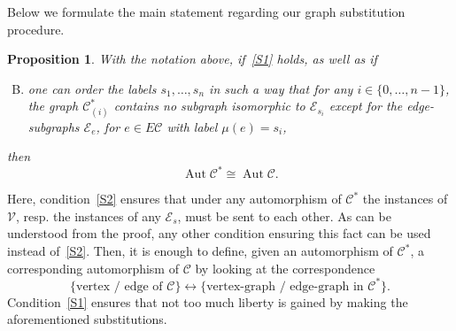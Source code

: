 \documentclass[10pt,a4paper]{amsart}
\newtheorem{prop}[theo]{Proposition}
\theoremstyle{definition}
\newcommand{\cC}{\mathcal{C}}
\newcommand{\cV}{\mathcal{V}}
\newcommand{\cE}{\mathcal{E}}
\DeclareMathOperator{\aut}{Aut}
\begin{document}
Below we formulate the main statement regarding our graph substitution procedure. 

\begin{prop} \label{prop:graph-substitution}
With the notation above, if~\ref{S1} holds, as well as if
\begin{enumerate}[S.\arabic*] %
\setcounter{enumi}{1}
\item \label{S2}
one can order the labels $s_{1}, \dots, s_n$ in such a way that for any $i\in\{0, \dots, n-1\}$, the graph $\cC^*_{(i)}$ contains no subgraph isomorphic to $\cE_{s_{i}}$ except for the edge-subgraphs $\cE_{e}$, for $e\in E\cC$ with label ${\mu}(e)=s_{i}$,
\end{enumerate}
then
\[
\aut \cC^* \cong \aut \cC.
\]
\end{prop}

Here, condition~\ref{S2} ensures that under any automorphism of $\cC^*$ the instances of $\cV$, resp. the instances of any $\cE_s$, must be sent to each other. As can be understood from the proof, any other condition ensuring this fact can be used instead of~\ref{S2}. Then, it is enough to define, given an automorphism of $\cC^*$, a corresponding automorphism of $\cC$ by looking at the correspondence 
\[
\{\text{vertex / edge of } \cC\} \leftrightarrow \{\text{vertex-graph / edge-graph in } \cC^*\}.
\] 
Condition~\ref{S1} ensures that not too much liberty is gained by making the aforementioned substitutions.
\end{document}
